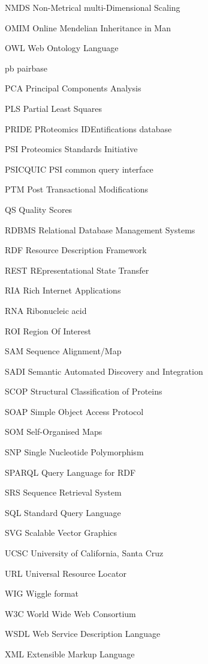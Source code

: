 \begin{abbreviations}
	\item[NMDS] Non-Metrical multi-Dimensional Scaling
	\item[OMIM] Online Mendelian Inheritance in Man
	\item[OWL] Web Ontology Language
	\item[pb] pairbase
	\item[PCA] Principal Components Analysis
	\item[PLS] Partial Least Squares
	\item[PRIDE] PRoteomics IDEntifications database
	\item[PSI] Proteomics Standards Initiative
	\item[PSICQUIC] PSI common query interface
	\item[PTM] Post Transactional Modifications
	\item[QS] Quality Scores
	\item[RDBMS] Relational Database Management Systems
	\item[RDF] Resource Description Framework
	\item[REST] REpresentational State Transfer
	\item[RIA] Rich Internet Applications
	\item[RNA] Ribonucleic acid
	\item[ROI] Region Of Interest
	\item[SAM] Sequence Alignment/Map 
	\item[SADI] Semantic Automated Discovery and Integration
	\item[SCOP] Structural Classification of Proteins
	\item[SOAP] Simple Object Access Protocol
	\item[SOM] Self-Organised Maps 
	\item[SNP] Single Nucleotide Polymorphism
	\item[SPARQL] Query Language for RDF
	\item[SRS] Sequence Retrieval System
	\item[SQL] Standard Query Language
	\item[SVG] Scalable Vector Graphics
	\item[UCSC] University of California, Santa Cruz
	\item[URL] Universal Resource Locator
	\item[WIG] Wiggle format
	\item[W3C] World Wide Web Consortium
	\item[WSDL] Web Service Description Language
	\item[XML] Extensible Markup Language
\end{abbreviations}
